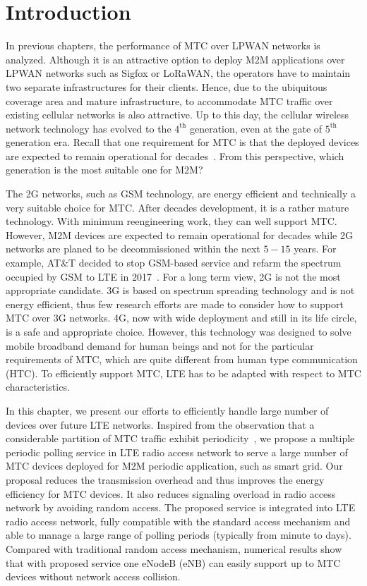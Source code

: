 \section{Introduction}
\label{sec:introduction}
In previous chapters, the performance of MTC over LPWAN networks is analyzed. Although it is an attractive option to deploy M2M applications over LPWAN networks such as Sigfox or LoRaWAN, the operators have to maintain two separate infrastructures for their clients. Hence, due to the ubiquitous coverage area and mature infrastructure, to accommodate MTC traffic over existing cellular networks is also attractive. Up to this day, the cellular wireless network technology has evolved to the $4^{\text{th}}$ generation, even at the gate of $5^{\text{th}}$ generation era. Recall that one requirement for MTC is that the deployed devices are expected to remain operational for decades~\cite{GrowthInM2M2011}. From this perspective, which generation is the most suitable one for M2M?

The 2G networks, such as GSM technology, are energy efficient and technically a very suitable choice for MTC. After decades development, it is a rather mature technology. With minimum reengineering work, they can well support MTC. However, M2M devices are expected to remain operational for decades while 2G networks are planed to be decommissioned within the next $5-15$ years. For example, AT\&T decided to stop GSM-based service and refarm the spectrum occupied by GSM to LTE in 2017~\cite{att2014}. For a long term view, 2G is not the most appropriate candidate. 3G is based on spectrum spreading technology and is not energy efficient, thus few research efforts are made to consider how to support MTC over 3G networks. 4G, now with wide deployment and still in its life circle, is a safe and appropriate choice. However, this technology was designed to solve mobile broadband demand for human beings and not for the particular requirements of MTC, which are quite different from human type communication (HTC). To efficiently support MTC, LTE has to be adapted with respect to MTC characteristics. 

In this chapter, we present our efforts to efficiently handle large number of devices over future LTE networks. Inspired from the observation that a considerable partition of MTC traffic exhibit periodicity~\cite{Costa14}, we propose a multiple periodic polling service in LTE radio access network to serve a large number of MTC devices deployed for M2M periodic application, such as smart grid. Our proposal reduces the transmission overhead and thus improves the energy efficiency for MTC devices. It also reduces signaling overload in radio access network by avoiding random access.  
The proposed service is integrated into LTE radio access network, fully compatible with the standard access mechanism and able to manage a large range of polling periods (typically from  minute to  days). Compared with traditional random access mechanism, numerical results show that with proposed service one eNodeB (eNB) can easily support up to  MTC devices without network access collision.  

